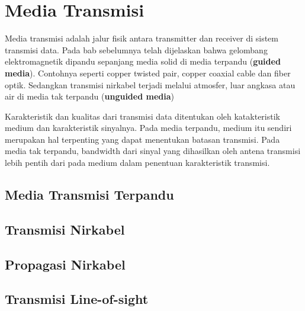 \chapter{Media Transmisi}

Media transmisi adalah jalur fisik antara transmitter dan receiver di sistem transmisi data. Pada bab sebelumnya telah dijelaskan bahwa gelombang elektromagnetik dipandu sepanjang media solid di media terpandu (\textbf{guided media}). Contohnya seperti copper twisted pair, copper coaxial cable dan fiber optik. Sedangkan transmisi nirkabel terjadi melalui atmosfer, luar angkasa atau air di media tak terpandu (\textbf{unguided media})

Karakteristik dan kualitas dari transmisi data ditentukan oleh katakteristik medium dan karakteristik sinyalnya. Pada media terpandu, medium itu sendiri merupakan hal terpenting yang dapat menentukan batasan transmisi. Pada media tak terpandu, bandwidth dari sinyal yang dihasilkan oleh antena transmisi lebih pentih dari pada medium dalam penentuan karakteristik transmisi.

\section{Media Transmisi Terpandu}

\section{Transmisi Nirkabel}

\section{Propagasi Nirkabel}

\section{Transmisi Line-of-sight}

